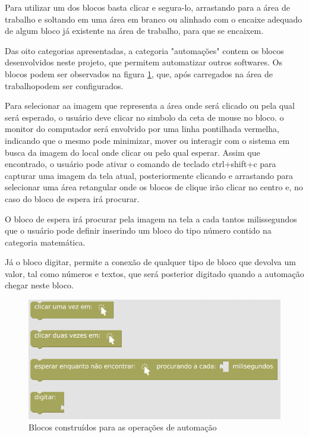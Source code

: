 \documentclass[tg]{mdtufsm}
\begin{document}
                Para utilizar um dos blocos basta clicar e segura-lo, arrastando para a área de trabalho e soltando em uma área em branco ou alinhado com o encaixe adequado de algum bloco já existente na área de trabalho, para que se encaixem.

                Das oito categorias apresentadas, a categoria "automações" contem os blocos desenvolvidos neste projeto, que permitem automatizar outros softwares. Os blocos podem ser observados na figura \ref{fig:myblocks}, que, após carregados na área de trabalhopodem ser configurados.

                Para selecionar aa imagem que representa a área onde será clicado ou pela qual será esperado, o usuário deve clicar no simbolo da ceta de mouse no bloco. o monitor do computador será envolvido por uma linha pontilhada vermelha, indicando que o mesmo pode minimizar, mover ou interagir com o sistema em busca da imagem do local onde clicar ou pelo qual esperar. Assim que encontrado, o usuário pode ativar o comando de teclado ctrl+shift+c para capturar uma imagem da tela atual, posteriormente clicando e arrastando para selecionar uma área retangular onde os blocos de clique irão clicar no centro e, no caso do bloco de espera irá procurar.

                O bloco de espera irá procurar pela imagem na tela a cada tantos milissegundos que o usuário pode definir inserindo um bloco do tipo número contido na categoria matemática.

                Já o bloco digitar, permite a conexão de qualquer tipo de bloco que devolva um valor, tal como números e textos, que será posterior digitado quando a automação chegar neste bloco.

                \begin{figure}[!htb]
                    {\centering
                    \includegraphics[width=1.0\textwidth]{imagens/blocks.png}
                    \caption{Blocos construídos para as operações de automação}
                    \label{fig:myblocks}}
                \end{figure}
\end{document}
